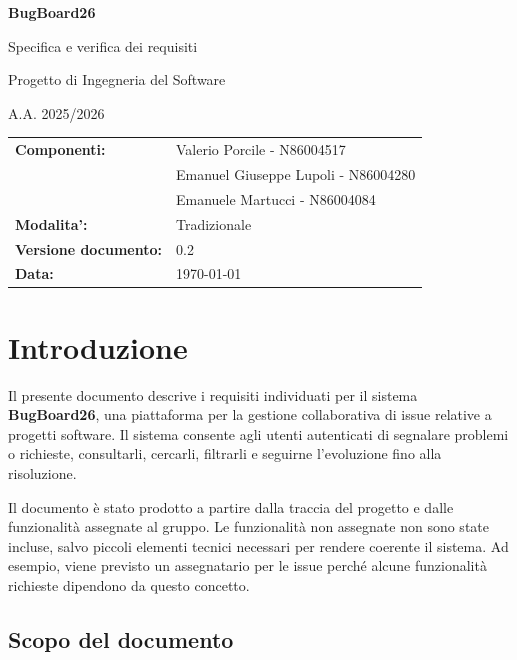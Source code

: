 \documentclass[12pt,a4paper]{article}
\begin{document}
\begin{titlepage}
    \centering
    \vspace*{2cm}
    {\Huge \textbf{BugBoard26} \par}
    \vspace{0.5cm}
    {\Large Specifica e verifica dei requisiti \par}
    \vspace{1cm}
    {\large Progetto di Ingegneria del Software \par}
    {\large A.A. 2025/2026 \par}
    \vfill
    \begin{tabular}{ll}
        \textbf{Componenti:} & Valerio Porcile - N86004517 \\
                              & Emanuel Giuseppe Lupoli - N86004280 \\
                              & Emanuele Martucci - N86004084 \\
        \textbf{Modalita':} & Tradizionale \\
        \textbf{Versione documento:} & 0.2 \\
        \textbf{Data:} & \today \\
    \end{tabular}
    \vfill
\end{titlepage}

\tableofcontents
\newpage

\section{Introduzione}

Il presente documento descrive i requisiti individuati per il sistema \textbf{BugBoard26}, una piattaforma per la gestione collaborativa di issue relative a progetti software. Il sistema consente agli utenti autenticati di segnalare problemi o richieste, consultarli, cercarli, filtrarli e seguirne l'evoluzione fino alla risoluzione.

Il documento è stato prodotto a partire dalla traccia del progetto e dalle funzionalità assegnate al gruppo. Le funzionalità non assegnate non sono state incluse, salvo piccoli elementi tecnici necessari per rendere coerente il sistema. Ad esempio, viene previsto un assegnatario per le issue perché alcune funzionalità richieste dipendono da questo concetto.

\subsection{Scopo del documento}
\end{document}
